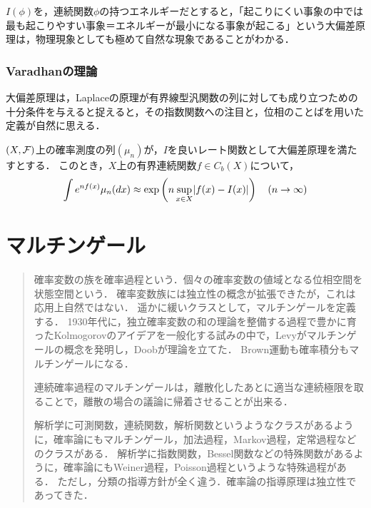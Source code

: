\documentclass[uplatex,dvipdfmx]{jsreport}
\begin{document}
\begin{tcolorbox}[colframe=ForestGreen, colback=ForestGreen!10!white,breakable,colbacktitle=ForestGreen!40!white,coltitle=black,fonttitle=\bfseries\sffamily,
title=確率過程に関する大偏差原理]
    $I(\phi)$を，連続関数$\phi$の持つエネルギーだとすると，「起こりにくい事象の中では最も起こりやすい事象＝エネルギーが最小になる事象が起こる」という大偏差原理は，物理現象としても極めて自然な現象であることがわかる．
\end{tcolorbox}

\subsection{Varadhanの理論}

\begin{tcolorbox}[colframe=ForestGreen, colback=ForestGreen!10!white,breakable,colbacktitle=ForestGreen!40!white,coltitle=black,fonttitle=\bfseries\sffamily,
title=]
    大偏差原理は，Laplaceの原理が有界線型汎関数の列に対しても成り立つための十分条件を与えると捉えると，その指数関数への注目と，位相のことばを用いた定義が自然に思える．
\end{tcolorbox}

\begin{lemma}
    $(X,\mathcal{F})$上の確率測度の列$(\mu_n)$が，$I$を良いレート関数として大偏差原理を満たすとする．
    このとき，$X$上の有界連続関数$f\in C_b(X)$について，
    \[\int e^{nf(x)}\mu_n(dx)\approx\exp\left(n\sup_{x\in X}\lvert f(x)-I(x)\rvert\right)\quad(n\to\infty)\]
\end{lemma}

\chapter{マルチンゲール}

\begin{quotation}
    確率変数の族を確率過程という．個々の確率変数の値域となる位相空間を状態空間という．
    確率変数族には独立性の概念が拡張できたが，これは応用上自然ではない．
    遥かに緩いクラスとして，マルチンゲールを定義する．
    1930年代に，独立確率変数の和の理論を整備する過程で豊かに育ったKolmogorovのアイデアを一般化する試みの中で，Levyがマルチンゲールの概念を発明し，Doobが理論を立てた．
    Brown運動も確率積分もマルチンゲールになる．

    連続確率過程のマルチンゲールは，離散化したあとに適当な連続極限を取ることで，離散の場合の議論に帰着させることが出来る．

    解析学に可測関数，連続関数，解析関数というようなクラスがあるように，確率論にもマルチンゲール，加法過程，Markov過程，定常過程などのクラスがある．
    解析学に指数関数，Bessel関数などの特殊関数があるように，確率論にもWeiner過程，Poisson過程というような特殊過程がある．
    ただし，分類の指導方針が全く違う．確率論の指導原理は独立性であってきた．
\end{quotation}
\end{document}
